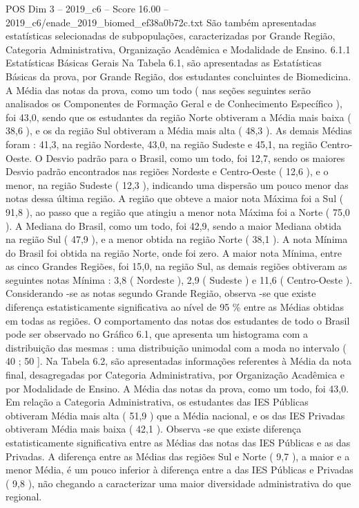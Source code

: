 \begin{textsample}{POS Dim 3 – 2019\_c6 – Score 16.00 – 2019\_c6/enade\_2019\_biomed\_ef38a0b72c.txt}
São também apresentadas estatísticas selecionadas de subpopulações, caracterizadas por Grande Região, Categoria Administrativa, Organização Acadêmica e Modalidade de Ensino. 6.1.1 Estatísticas Básicas Gerais Na Tabela 6.1, são apresentadas as Estatísticas Básicas da prova, por Grande Região, dos estudantes concluintes de Biomedicina.
A Média das notas da prova, como um todo ( nas seções seguintes serão analisados os Componentes de Formação Geral e de Conhecimento Específico ), foi 43,0, sendo que os estudantes da região Norte obtiveram a Média mais baixa ( 38,6 ), e os da região Sul obtiveram a Média mais alta ( 48,3 ).
As demais Médias foram : 41,3, na região Nordeste, 43,0, na região Sudeste e 45,1, na região Centro-Oeste.
O Desvio padrão para o Brasil, como um todo, foi 12,7, sendo os maiores Desvio padrão encontrados nas regiões Nordeste e Centro-Oeste ( 12,6 ), e o menor, na região Sudeste ( 12,3 ), indicando uma dispersão um pouco menor das notas dessa última região.
A região que obteve a maior nota Máxima foi a Sul ( 91,8 ), ao passo que a região que atingiu a menor nota Máxima foi a Norte ( 75,0 ).
A Mediana do Brasil, como um todo, foi 42,9, sendo a maior Mediana obtida na região Sul ( 47,9 ), e a menor obtida na região Norte ( 38,1 ).
A nota Mínima do Brasil foi obtida na região Norte, onde foi zero.
A maior nota Mínima, entre as cinco Grandes Regiões, foi 15,0, na região Sul, as demais regiões obtiveram as seguintes notas Mínima : 3,8 ( Nordeste ), 2,9 ( Sudeste ) e 11,6 ( Centro-Oeste ).
Considerando -se as notas segundo Grande Região, observa -se que existe diferença estatisticamente significativa ao nível de 95 \% entre as Médias obtidas em todas as regiões.
O comportamento das notas dos estudantes de todo o Brasil pode ser observado no Gráfico 6.1, que apresenta um histograma com a distribuição das mesmas : uma distribuição unimodal com a moda no intervalo ( 40 ; 50 ].
Na Tabela 6.2, são apresentadas informações referentes à Média da nota final, desagregadas por Categoria Administrativa, por Organização Acadêmica e por Modalidade de Ensino.
A Média das notas da prova, como um todo, foi 43,0.
Em relação a Categoria Administrativa, os estudantes das IES Públicas obtiveram Média mais alta ( 51,9 ) que a Média nacional, e os das IES Privadas obtiveram Média mais baixa ( 42,1 ).
Observa -se que existe diferença estatisticamente significativa entre as Médias das notas das IES Públicas e as das Privadas.
A diferença entre as Médias das regiões Sul e Norte ( 9,7 ), a maior e a menor Média, é um pouco inferior à diferença entre a das IES Públicas e Privadas ( 9,8 ), não chegando a caracterizar uma maior diversidade administrativa do que regional.

\end{textsample}
